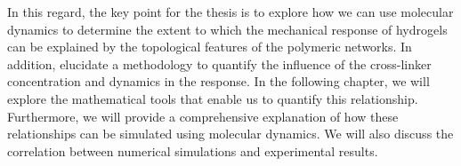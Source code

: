 In this regard, the key point for the thesis is to explore how we can use molecular dynamics to determine the extent to which the mechanical response of hydrogels can be explained by the topological features of the polymeric networks.
In addition, elucidate a methodology to quantify the influence of the cross-linker concentration and dynamics in the response.
In the following chapter, we will explore the mathematical tools that enable us to quantify this relationship.
Furthermore, we will provide a comprehensive explanation of how these relationships can be simulated using molecular dynamics. 
We will also discuss the correlation between numerical simulations and experimental results.



